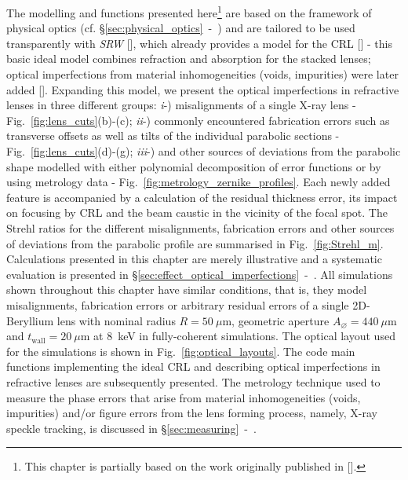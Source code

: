 \begin{refsection}
The modelling and functions presented here\footnote{This chapter is partially based on the work originally published in [\cite{Celestre2020b}].} are based on the framework of physical optics (cf. \S\ref{sec:physical_optics}~-~\textit{}) and are tailored to be used transparently with \textit{SRW} [\cite{Chubar1998}], which already provides a model for the CRL [\cite{Baltser2011}] - this basic ideal model combines refraction and absorption for the stacked lenses; optical imperfections from material inhomogeneities (voids, impurities) were later added [\cite{Roth2014}]. Expanding this model, we present the optical imperfections in refractive lenses in three different groups: \textit{i}-) misalignments of a single X-ray lens - Fig.~\ref{fig:lens_cuts}(b)-(c); \textit{ii}-) commonly encountered fabrication errors such as transverse offsets as well as tilts of the individual parabolic sections - Fig.~\ref{fig:lens_cuts}(d)-(g); \textit{iii}-) and other sources of deviations from the parabolic shape modelled with either polynomial decomposition of error functions or by using metrology data - Fig.~\ref{fig:metrology_zernike_profiles}. Each newly added feature is accompanied by a calculation of the residual thickness error, its impact on focusing by CRL and the beam caustic in the vicinity of the focal spot. The Strehl ratios for the different misalignments, fabrication errors and other sources of deviations from the parabolic profile are summarised in Fig.~\ref{fig:Strehl_m}. Calculations presented in this chapter are merely illustrative and a systematic evaluation is presented in \S\ref{sec:effect_optical_imperfections}~-~\textit{}. All simulations shown throughout this chapter have similar conditions, that is, they model misalignments, fabrication errors or arbitrary residual errors of a single 2D-Beryllium lens with nominal radius $R=50~\mu\text{m}$, geometric aperture $A_{\diameter}=440~\mu\text{m}$ and $t_\text{wall}=20~\mu$m at 8~keV in fully-coherent simulations. The optical layout used for the simulations is shown in Fig.~\ref{fig:optical_layouts}. The code main functions implementing the ideal CRL and describing optical imperfections in refractive lenses are subsequently presented. The metrology technique used to measure the phase errors that arise from material inhomogeneities (voids, impurities) and/or figure errors from the lens forming process, namely, X-ray speckle tracking, is discussed in \S\ref{sec:measuring}~-~\textit{}.


\end{refsection}

